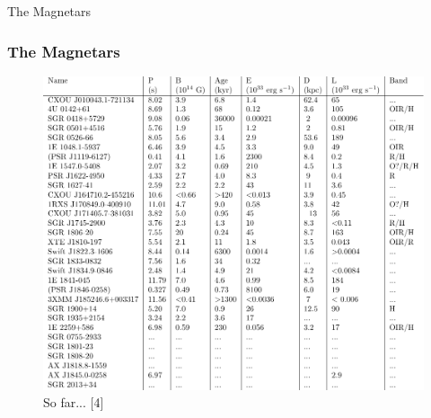 \documentclass[hyperref=pdftex, presentation]{beamer}
\begin{document}
\begin{frame}{\Large The Magnetars}
\frametitle{\Large The Magnetars}

\begin{figure}
	\includegraphics[scale=.5]{tables/magnetar_table.pdf}
	\caption{So far... [4]}
\end{figure}

\end{frame}


\end{document}
